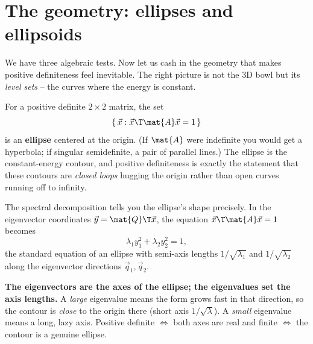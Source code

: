 \section{The geometry: ellipses and ellipsoids}

We have three algebraic tests. Now let us cash in the geometry that makes positive definiteness feel
inevitable. The right picture is not the 3D bowl but its \emph{level sets} -- the curves where the
energy is constant.

For a positive definite $2\times2$ matrix, the set
\[
  \{\,\vec{x} : \vec{x}\T\mat{A}\vec{x} = 1\,\}
\]
is an \textbf{ellipse} centered at the origin. (If $\mat{A}$ were indefinite you would get a
hyperbola; if singular semidefinite, a pair of parallel lines.) The ellipse is the constant-energy
contour, and positive definiteness is exactly the statement that these contours are \emph{closed
loops} hugging the origin rather than open curves running off to infinity.

The spectral decomposition tells you the ellipse's shape precisely. In the eigenvector coordinates
$\vec{y} = \mat{Q}\T\vec{x}$, the equation $\vec{x}\T\mat{A}\vec{x}=1$ becomes
\[
  \lambda_1 y_1^2 + \lambda_2 y_2^2 = 1,
\]
the standard equation of an ellipse with semi-axis lengths $1/\sqrt{\lambda_1}$ and
$1/\sqrt{\lambda_2}$ along the eigenvector directions $\vec{q}_1, \vec{q}_2$.

\begin{focusbox}
\textbf{The eigenvectors are the axes of the ellipse; the eigenvalues set the axis lengths.} A
\emph{large} eigenvalue means the form grows fast in that direction, so the contour is \emph{close}
to the origin there (short axis $1/\sqrt\lambda$). A \emph{small} eigenvalue means a long, lazy axis.
Positive definite $\Leftrightarrow$ both axes are real and finite $\Leftrightarrow$ the contour is a
genuine ellipse.
\end{focusbox}

